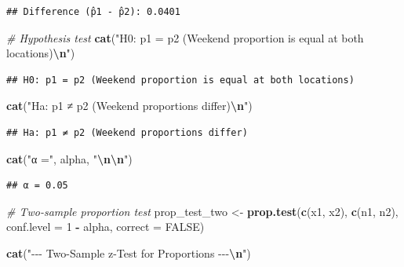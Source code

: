 \documentclass[
  12pt,
]{article}
\newenvironment{Shaded}{\begin{snugshade}}{\end{snugshade}}
\newcommand{\AttributeTok}[1]{\textcolor[rgb]{0.13,0.29,0.53}{#1}}
\newcommand{\CommentTok}[1]{\textcolor[rgb]{0.56,0.35,0.01}{\textit{#1}}}
\newcommand{\ConstantTok}[1]{\textcolor[rgb]{0.56,0.35,0.01}{#1}}
\newcommand{\DecValTok}[1]{\textcolor[rgb]{0.00,0.00,0.81}{#1}}
\newcommand{\FunctionTok}[1]{\textcolor[rgb]{0.13,0.29,0.53}{\textbf{#1}}}
\newcommand{\NormalTok}[1]{#1}
\newcommand{\OtherTok}[1]{\textcolor[rgb]{0.56,0.35,0.01}{#1}}
\newcommand{\SpecialCharTok}[1]{\textcolor[rgb]{0.81,0.36,0.00}{\textbf{#1}}}
\newcommand{\StringTok}[1]{\textcolor[rgb]{0.31,0.60,0.02}{#1}}
\begin{document}
\begin{verbatim}
## Difference (p̂1 - p̂2): 0.0401
\end{verbatim}

\begin{Shaded}
\begin{Highlighting}[]
\CommentTok{\# Hypothesis test}
\FunctionTok{cat}\NormalTok{(}\StringTok{"H0: p1 = p2 (Weekend proportion is equal at both locations)}\SpecialCharTok{\textbackslash{}n}\StringTok{"}\NormalTok{)}
\end{Highlighting}
\end{Shaded}

\begin{verbatim}
## H0: p1 = p2 (Weekend proportion is equal at both locations)
\end{verbatim}

\begin{Shaded}
\begin{Highlighting}[]
\FunctionTok{cat}\NormalTok{(}\StringTok{"Ha: p1 ≠ p2 (Weekend proportions differ)}\SpecialCharTok{\textbackslash{}n}\StringTok{"}\NormalTok{)}
\end{Highlighting}
\end{Shaded}

\begin{verbatim}
## Ha: p1 ≠ p2 (Weekend proportions differ)
\end{verbatim}

\begin{Shaded}
\begin{Highlighting}[]
\FunctionTok{cat}\NormalTok{(}\StringTok{"α ="}\NormalTok{, alpha, }\StringTok{"}\SpecialCharTok{\textbackslash{}n\textbackslash{}n}\StringTok{"}\NormalTok{)}
\end{Highlighting}
\end{Shaded}

\begin{verbatim}
## α = 0.05
\end{verbatim}

\begin{Shaded}
\begin{Highlighting}[]
\CommentTok{\# Two{-}sample proportion test}
\NormalTok{prop\_test\_two }\OtherTok{\textless{}{-}} \FunctionTok{prop.test}\NormalTok{(}\FunctionTok{c}\NormalTok{(x1, x2), }\FunctionTok{c}\NormalTok{(n1, n2), }\AttributeTok{conf.level =} \DecValTok{1} \SpecialCharTok{{-}}
\NormalTok{    alpha, }\AttributeTok{correct =} \ConstantTok{FALSE}\NormalTok{)}

\FunctionTok{cat}\NormalTok{(}\StringTok{"{-}{-}{-} Two{-}Sample z{-}Test for Proportions {-}{-}{-}}\SpecialCharTok{\textbackslash{}n}\StringTok{"}\NormalTok{)}
\end{Highlighting}
\end{Shaded}
\end{document}
